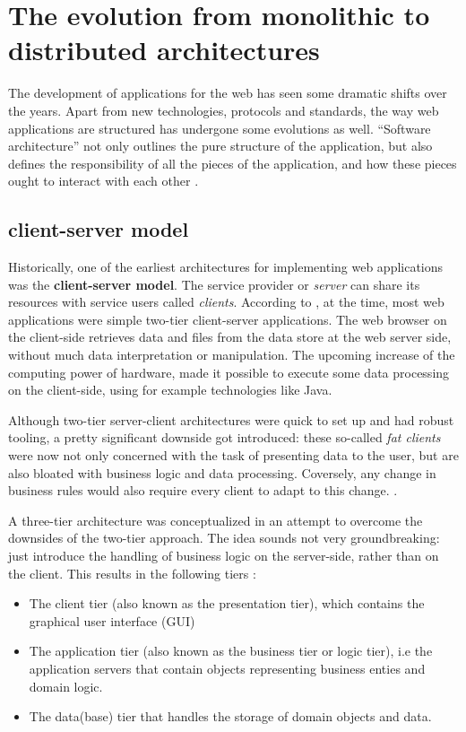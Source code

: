\section{The evolution from monolithic to distributed architectures}

The development of applications for the web has seen some dramatic shifts over
the years. Apart from new technologies, protocols and standards, the way web
applications are structured has undergone some evolutions as well. ``Software
architecture'' not only outlines the pure structure of the application, but also
defines the responsibility of all the pieces of the application, and how these
pieces ought to interact with each other \autocite{Fedorov_etal_1998}.


\subsection{client-server model}

Historically, one of the earliest architectures for implementing web
applications was the \textbf{client-server model}. The service provider or
\textit{server} can share its resources with service users called
\textit{clients}. According to \textcite{Reese_2000}, at the time, most web
applications were simple two-tier client-server applications. The web browser on
the client-side retrieves data and files from the data store at the web server
side, without much data interpretation or manipulation. The upcoming increase of
the computing power of hardware, made it possible to execute some data
processing on the client-side, using for example technologies like Java. 

Although two-tier server-client architectures were quick to set up and had
robust tooling, a pretty significant downside got introduced: these so-called
\textit{fat clients} were now not only concerned with the task of presenting
data to the user, but are also bloated with business logic and data processing.
Coversely, any change in business rules would also require every client to adapt
to this change. \autocite{Gallaugher_Ramanathan_1996}.

A three-tier architecture was conceptualized in an attempt to overcome the
downsides of the two-tier approach. The idea sounds not very groundbreaking:
just introduce the handling of business logic on the server-side, rather than on
the client. This results in the following tiers \autocite{Aarsten_etal_1996}:

\begin{itemize}
    \item The client tier (also known as the presentation tier), which contains
    the graphical user interface (GUI)
    \item The application tier (also known as the business tier or logic tier),
    i.e the application servers that contain objects representing business
    enties and domain logic.
    \item The data(base) tier that handles the storage of domain objects and data.
\end{itemize}








